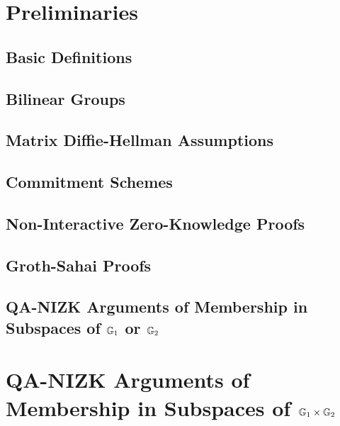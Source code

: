\chapter{Preliminaries}

    \section{Basic Definitions}

        

    \section{Bilinear Groups}

    \section{Matrix Diffie-Hellman  Assumptions}

        

    \section{Commitment Schemes} \label{sec:commitments}

        

    \section{Non-Interactive Zero-Knowledge Proofs} \label{sec:zk}

        

    \section{Groth-Sahai Proofs}\label{sec:gs-proofs}

        

    \section{QA-NIZK Arguments of Membership in Subspaces of $\mathbb{G}_1$ or $\mathbb{G}_2$} \label{sect:QANIZKlinspace}

        

    
\chapter{QA-NIZK Arguments of Membership in Subspaces of $\mathbb{G}_1\times\mathbb{G}_2$}\label{sec:agg-asym}
    
